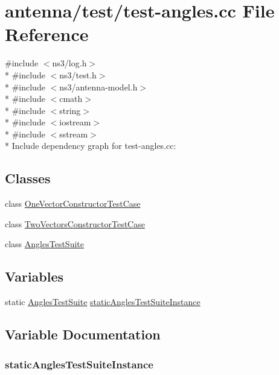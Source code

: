 \hypertarget{test-angles_8cc}{}\section{antenna/test/test-\/angles.cc File Reference}
\label{test-angles_8cc}
{\ttfamily \#include $<$ns3/log.\+h$>$}\\*
{\ttfamily \#include $<$ns3/test.\+h$>$}\\*
{\ttfamily \#include $<$ns3/antenna-\/model.\+h$>$}\\*
{\ttfamily \#include $<$cmath$>$}\\*
{\ttfamily \#include $<$string$>$}\\*
{\ttfamily \#include $<$iostream$>$}\\*
{\ttfamily \#include $<$sstream$>$}\\*
Include dependency graph for test-\/angles.cc\+:
\subsection*{Classes}
\begin{DoxyCompactItemize}
\item 
class \hyperlink{classOneVectorConstructorTestCase}{One\+Vector\+Constructor\+Test\+Case}
\item 
class \hyperlink{classTwoVectorsConstructorTestCase}{Two\+Vectors\+Constructor\+Test\+Case}
\item 
class \hyperlink{classAnglesTestSuite}{Angles\+Test\+Suite}
\end{DoxyCompactItemize}
\subsection*{Variables}
\begin{DoxyCompactItemize}
\item 
static \hyperlink{classAnglesTestSuite}{Angles\+Test\+Suite} \hyperlink{test-angles_8cc_ad7552fada504da75504eeb516084c7ce}{static\+Angles\+Test\+Suite\+Instance}
\end{DoxyCompactItemize}


\subsection{Variable Documentation}
\subsubsection[{\texorpdfstring{static\+Angles\+Test\+Suite\+Instance}{staticAnglesTestSuiteInstance}}]{ static\+Angles\+Test\+Suite\+Instance\hspace{0.3cm}{\ttfamily [static]}}\hypertarget{test-angles_8cc_ad7552fada504da75504eeb516084c7ce}{}\label{test-angles_8cc_ad7552fada504da75504eeb516084c7ce}
